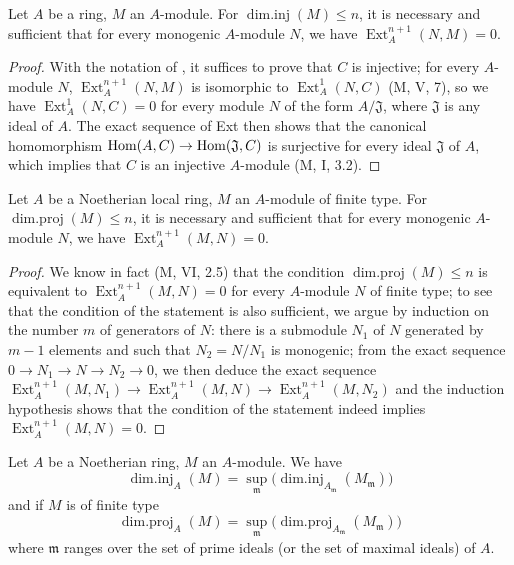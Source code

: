 \begin{lemma}[17.2.3]
\label{0.17.2.3}
Let $A$ be a ring, $M$ an $A$-module.
For $\operatorname{dim.inj}(M)\leq n$, it is necessary and sufficient that for every \textup{monogenic} $A$-module $N$, we have $\operatorname{Ext}^{n+1}_A(N,M)=0$.
\end{lemma}

\begin{proof}
With the notation of , it suffices to prove that $C$ is injective;
for every $A$-module $N$, $\operatorname{Ext}^{n+1}_A(N,M)$ is isomorphic to $\operatorname{Ext}^1_A(N,C)$ (M, V, 7), so we have $\operatorname{Ext}^1_A(N,C)=0$ for every module $N$ of the form $A/\mathfrak{J}$, where $\mathfrak{J}$ is any ideal of $A$.
The exact sequence of Ext then shows that the canonical homomorphism $\operatorname{Hom}(A,C)\to\operatorname{Hom}(\mathfrak{J},C)$ is surjective for every ideal $\mathfrak{J}$ of $A$, which implies that $C$ is an injective $A$-module (M, I, 3.2).
\end{proof}

\begin{lemma}[17.2.4]
\label{0.17.2.4}
Let $A$ be a Noetherian local ring, $M$ an $A$-module of finite type.
For $\operatorname{dim.proj}(M)\leq n$, it is necessary and sufficient that for every \textup{monogenic} $A$-module $N$, we have $\operatorname{Ext}^{n+1}_A(M,N)=0$.
\end{lemma}

\begin{proof}
We know in fact (M, VI, 2.5) that the condition $\operatorname{dim.proj}(M)\leq n$ is equivalent to $\operatorname{Ext}^{n+1}_A(M,N)=0$ for every $A$-module $N$ of finite type;
to see that the condition of the statement is also sufficient, we argue by induction on the number $m$ of generators of $N$:
there is a submodule $N_1$ of $N$ generated by $m-1$ elements and such that $N_2=N/N_1$ is monogenic;
from the exact sequence $0\to N_1\to N\to N_2\to 0$, we then deduce the exact sequence $\operatorname{Ext}^{n+1}_A(M,N_1)\to\operatorname{Ext}^{n+1}_A(M,N)\to\operatorname{Ext}^{n+1}_A(M,N_2)$ and the induction hypothesis shows that the condition of the statement indeed implies $\operatorname{Ext}^{n+1}_A(M,N)=0$.
\end{proof}

\begin{corollary}[17.2.5]
\label{0.17.2.5}
Let $A$ be a Noetherian ring, $M$ an $A$-module.
We have
\[
\label{0.17.2.5.1}
  \operatorname{dim.inj}_A(M)=\sup_\mathfrak{m}\big(\operatorname{dim.inj}_{A_\mathfrak{m}}(M_\mathfrak{m})\big)
  \tag{17.2.5.1}
\]
and if $M$ is of finite type
\[
\label{0.17.2.5.2}
  \operatorname{dim.proj}_A(M)=\sup_\mathfrak{m}\big(\operatorname{dim.proj}_{A_\mathfrak{m}}(M_\mathfrak{m})\big)
  \tag{17.2.5.2}
\]
where $\mathfrak{m}$ ranges over the set of prime ideals (or the set of maximal ideals) of $A$.
\end{corollary}

